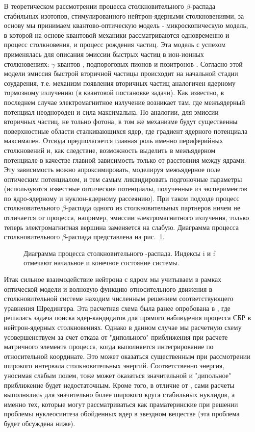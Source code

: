 В теоретическом рассмотрении процесса столкновительного $\beta$-рас\-па\-да стабильных изотопов, стимулированного
нейтрон-ядерными столкновениями, за основу мы принимаем квантово-оптическую модель - микроскопическую модель, в которой
на основе квантовой механики рассматриваются одновременно и процесс столкновения, и процесс рождения частиц. Эта модель с
успехом применялась для описания эмиссии быстрых частиц в ион-ионных столкновениях: $\gamma$-квантов \cite{kamanin},
подпороговых пионов \cite{batkinech} и позитронов \cite{minin}. Согласно этой модели эмиссия быстрой вторичной частицы
происходит на начальной стадии соударения, т.е. механизм появления вторичных частиц аналогичен ядерному тормозному
излучению (в квантовой постановке задачи). Как известно, в последнем случае электромагнитное излучение возникает там, где
межъядерный потенциал неоднороден и сила максимальна. По аналогии, для эмиссии вторичных частиц, не тольно фотона, в том
же механизме будут существенны поверхностные области сталкивающихся ядер, где градиент ядерного потенциала максимален.
Отсюда предполагается главная роль именно периферийных столкновений и, как следствие, возможность выделить в межъядерном
потенциале в качестве главной зависимость только от расстояния между ядрами. Эту зависимость можно апроксимировать,
моделируя межъядерное поле оптическим потенциалом, и тем самым ликвидировать подгоночные параметры (используются
известные оптические потенциалы, полученные из экспериментов по ядро-ядерному и нуклон-ядерному рассеянию). При таком
подходе процесс столкновительного $\beta$-распада одного из столкновительных партнеров  ничем не отличается от процесса,
например, эмиссии электромагнитного излучения, только теперь электромагнитная вершина заменяется на слабую. Диаграмма
процесса столкновительного $\beta$-распада представлена на рис.~\ref{DSBR}.

\begin{figure}
\vspace{5 true cm}
\caption{Диаграмма процесса столкновительного \be-распада. Индексы
i и f отмечают начальное и конечное состояние системы.}
\label{DSBR}
\end{figure}


 Итак сильное
взаимодействие нейтрона с ядром мы учитываем в рамках оптической модели и волновую функцию относительного движения в
столкновительной системе находим численным решением соответствующего уравнения Шредингера. Эта расчетная схема была ранее
опробована в \cite{karpov}, где решалась задача поиска ядер-кандидатов для прямого наблюдения процесса СБР в
нейтрон-ядерных столкновениях. Однако в данном случае мы расчетную схему усовершенствуем за счет отказа от "дипольного"
приближения при расчете матричного элемента процесса, когда выполняется интегрирование по относительной координате. Это
может оказаться существенным при рассмотрении широкого интервала столкновительных энергий. Соответственно энергия,
уносимая слабым полем, тоже может оказаться значительной и "дипольное" приближение будет недостаточным. Кроме того, в
отличие от \cite{karpov}, сами расчеты выполнялись для значительно более широкого круга стабильных нуклидов, а именно
тех, которые могут рассматриваться как праматеринские при решении проблемы нуклеосинтеза обойденных ядер в звездном
веществе (эта проблема будет обсуждена ниже).


